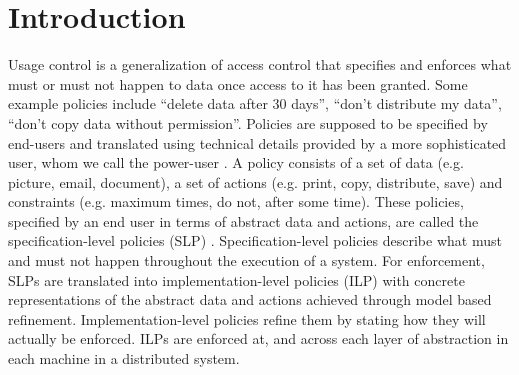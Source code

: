 \documentclass{sig-alternate}
\begin{document}
\maketitle
\begin{abstract}
Adaptive Model-Based Policy Translation for Usage Control abstract
This paper provides a sample of a \LaTeX\ document which conforms to
the formatting guidelines for ACM SIG Proceedings.
\end{abstract}




\section{Introduction}
Usage control is a generalization of access control that specifies and enforces what 
must or must not happen to data once access to it has been granted. 
Some example policies include ``delete data after 30 days'', ``don't distribute my data'', ``don't copy data without permission''.
Policies are supposed to be specified by end-users and translated using technical details provided by a more sophisticated user, whom we call the power-user \cite{proceeding4}. 
A policy consists of a set of data (e.g. picture, email, document), 
a set of actions (e.g. print, copy, distribute, save) and constraints (e.g. maximum times, do not, after some time).
These policies, specified by an end user in terms of abstract data and actions, are called the specification-level policies (SLP) \cite{proceeding5}. 
Specification-level policies describe what must and must not happen throughout the execution of a system. 
For enforcement, SLPs are translated into implementation-level policies (ILP) with concrete representations of the abstract data and actions achieved through model based refinement. 
Implementation-level policies refine them by stating how they will actually be enforced.
ILPs are enforced at, and across each layer of abstraction in each machine in a distributed system. 
\end{document}
